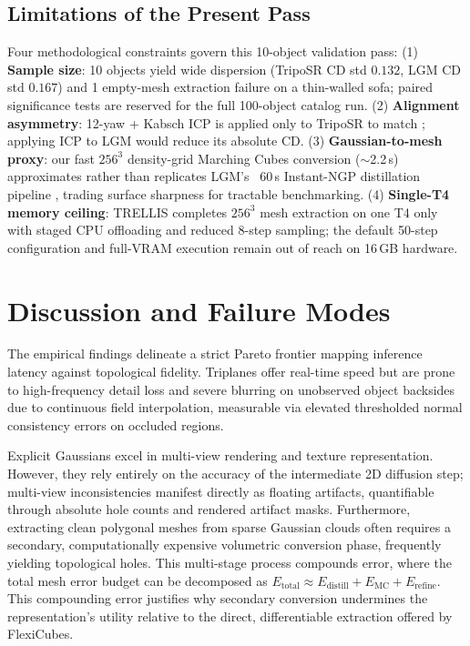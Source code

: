 \documentclass[10pt, conference]{IEEEtran}
\begin{document}
\subsection{Limitations of the Present Pass}
\label{sec:limitations}
Four methodological constraints govern this 10-object validation pass: (1) \textbf{Sample size}: 10 objects yield wide dispersion (TripoSR CD std $0.132$, LGM CD std $0.167$) and 1 empty-mesh extraction failure on a thin-walled sofa; paired significance tests are reserved for the full 100-object catalog run. (2) \textbf{Alignment asymmetry}: 12-yaw + Kabsch ICP is applied only to TripoSR to match \cite{triposr2024}; applying ICP to LGM would reduce its absolute CD. (3) \textbf{Gaussian-to-mesh proxy}: our fast $256^3$ density-grid Marching Cubes conversion ($\sim$2.2\,s) approximates rather than replicates LGM's ~60\,s Instant-NGP distillation pipeline \cite{lgm2024}, trading surface sharpness for tractable benchmarking. (4) \textbf{Single-T4 memory ceiling}: TRELLIS completes $256^3$ mesh extraction on one T4 only with staged CPU offloading and reduced 8-step sampling; the default 50-step configuration and full-VRAM execution remain out of reach on 16\,GB hardware.

\section{Discussion and Failure Modes}

The empirical findings delineate a strict Pareto frontier mapping inference latency against topological fidelity. Triplanes offer real-time speed but are prone to high-frequency detail loss and severe blurring on unobserved object backsides due to continuous field interpolation, measurable via elevated thresholded normal consistency errors on occluded regions. 

Explicit Gaussians excel in multi-view rendering and texture representation. However, they rely entirely on the accuracy of the intermediate 2D diffusion step; multi-view inconsistencies manifest directly as floating artifacts, quantifiable through absolute hole counts and rendered artifact masks. Furthermore, extracting clean polygonal meshes from sparse Gaussian clouds often requires a secondary, computationally expensive volumetric conversion phase, frequently yielding topological holes. This multi-stage process compounds error, where the total mesh error budget can be decomposed as $E_{\text{total}} \approx E_{\text{distill}} + E_{\text{MC}} + E_{\text{refine}}$. This compounding error justifies why secondary conversion undermines the representation's utility relative to the direct, differentiable extraction offered by FlexiCubes.
\end{document}
